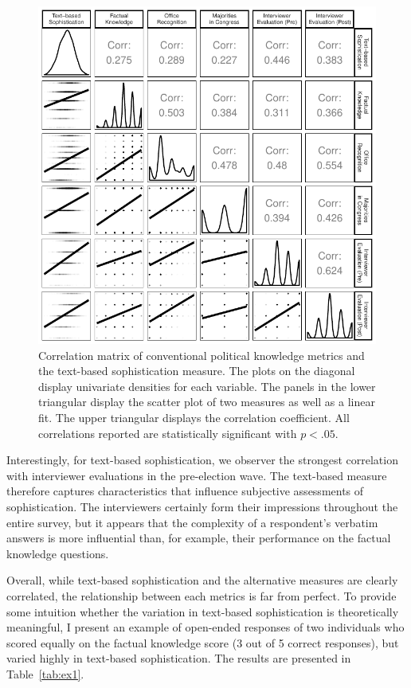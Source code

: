 \documentclass[12pt]{article}
\begin{document}
\begin{figure}[h]\centering
\includegraphics{../fig/corplot.pdf}
\caption{Correlation matrix of conventional political knowledge metrics and the text-based sophistication measure. The plots on the diagonal display univariate densities for each variable. The panels in the lower triangular display the scatter plot of two measures as well as a linear fit. The upper triangular displays the correlation coefficient. All correlations reported are statistically significant with $p<.05$.}\label{fig:corplot}
\end{figure}

Interestingly, for text-based sophistication, we observer the strongest correlation with interviewer evaluations in the pre-election wave. The text-based measure therefore captures characteristics that influence subjective assessments of sophistication. The interviewers certainly form their impressions throughout the entire survey, but it appears that the complexity of a respondent's verbatim answers is more influential than, for example, their performance on the factual knowledge questions.

Overall, while text-based sophistication and the alternative measures are clearly correlated, the relationship between each metrics is far from perfect. To provide some intuition whether the variation in text-based sophistication is theoretically meaningful, I present an example of open-ended responses of two individuals who scored equally on the factual knowledge score (3 out of 5 correct responses), but varied highly in text-based sophistication. The results are presented in Table~\ref{tab:ex1}.
\end{document}
